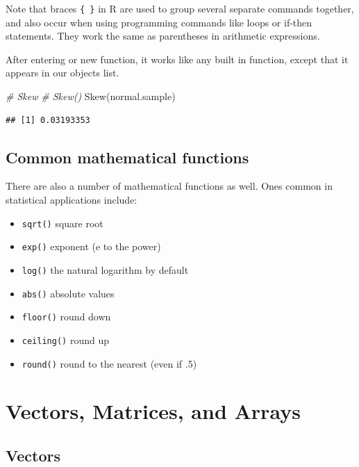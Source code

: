 \documentclass[
]{book}
\newenvironment{Shaded}{\begin{snugshade}}{\end{snugshade}}
\newcommand{\CommentTok}[1]{\textcolor[rgb]{0.56,0.35,0.01}{\textit{#1}}}
\newcommand{\FunctionTok}[1]{\textcolor[rgb]{0.00,0.00,0.00}{#1}}
\newcommand{\NormalTok}[1]{#1}
\providecommand{\tightlist}{%
  \setlength{\itemsep}{0pt}\setlength{\parskip}{0pt}}
\begin{document}
Note that braces \texttt{\{\ \}} in R are used to group several separate commands together, and also occur when using programming commands like loops or if-then statements. They work the same as parentheses in arithmetic expressions.

After entering or new function, it works like any built in function, except that it appears in our objects list.

\begin{Shaded}
\begin{Highlighting}[]
\CommentTok{\# Skew}
\CommentTok{\# Skew()}
\FunctionTok{Skew}\NormalTok{(normal.sample)}
\end{Highlighting}
\end{Shaded}

\begin{verbatim}
## [1] 0.03193353
\end{verbatim}

\hypertarget{common-mathematical-functions}{%
\subsection*{Common mathematical functions}\label{common-mathematical-functions}}

There are also a number of mathematical functions as well. Ones common in statistical applications include:

\begin{itemize}
\tightlist
\item
  \texttt{sqrt()} square root
\item
  \texttt{exp()} exponent (e to the power)
\item
  \texttt{log()} the natural logarithm by default
\item
  \texttt{abs()} absolute values
\item
  \texttt{floor()} round down
\item
  \texttt{ceiling()} round up
\item
  \texttt{round()} round to the nearest (even if .5)
\end{itemize}

\hypertarget{vectors-matrices-and-arrays}{%
\section{Vectors, Matrices, and Arrays}\label{vectors-matrices-and-arrays}}

\hypertarget{vectors}{%
\subsection*{Vectors}\label{vectors}}
\end{document}
